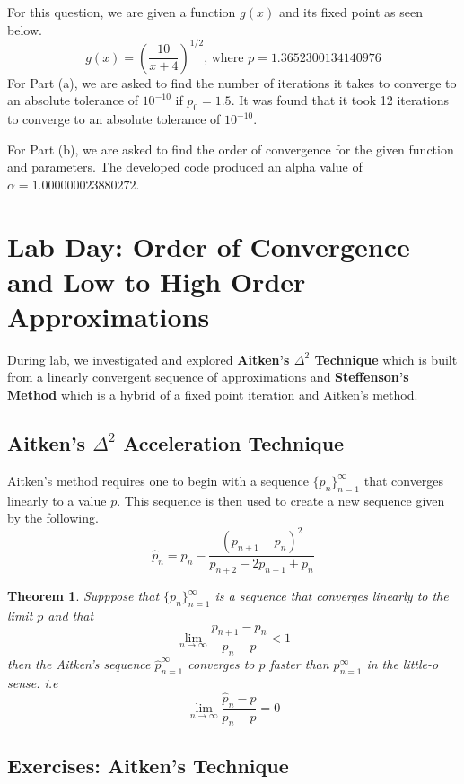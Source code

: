 \documentclass{article}
\begin{document}
\subsubsection{}
For this question, we are given a function \(g(x)\) and its fixed point as seen below.
\[
g(x) = (\frac{10}{x+4})^{1/2} \mbox{, where } p = 1.3652300134140976
\]
For Part (a), we are asked to find the number of iterations it takes to converge to an absolute tolerance of \(10^{-10}\) if \(p_0 = 1.5\). It was found that it took 12 iterations to converge to an absolute tolerance of \(10^{-10}\).

For Part (b), we are asked to find the order of convergence for the given function and parameters. The developed code produced an alpha value of \(\alpha = 1.000000023880272\).


\section{Lab Day: Order of Convergence and Low to High Order Approximations}
During lab, we investigated and explored \textbf{Aitken's \(\Delta^2\) Technique} which is built from a linearly convergent sequence of approximations and \textbf{Steffenson's Method} which is a hybrid of a fixed point iteration and Aitken’s method.

\subsection{Aitken's \(\Delta^2\) Acceleration Technique}
Aitken's method requires one to begin with a sequence \(\{p_n\}_{n=1}^{\infty}\) that converges linearly to a value \(p\). This sequence is then used to create a new sequence given by the following.
\[
\hat{p}_n = p_n - \frac{(p_{n+1}-p_n)^2}{p_{n+2}-2p_{n+1}+p_n}
\]
\newtheorem{theorem}{Theorem}
\begin{theorem}
    Supppose that \(\{p_n\}_{n=1}^{\infty}\) is a sequence that converges linearly to the limit \(p\) and that
    \[
    \lim_{n \to \infty}\frac{p_{n+1}-p_n}{p_n - p} < 1
    \]
    then the Aitken's sequence \(\hat{p}_{n=1}^\infty\) converges to \(p\) faster than \(p_{n=1}^\infty\) in the little-o sense. i.e
    \[
    \lim_{n \to \infty}\frac{\hat{p}_{n}-p}{p_n - p} =0 
    \]
\end{theorem}

\subsection{Exercises: Aitken's Technique}
\end{document}
